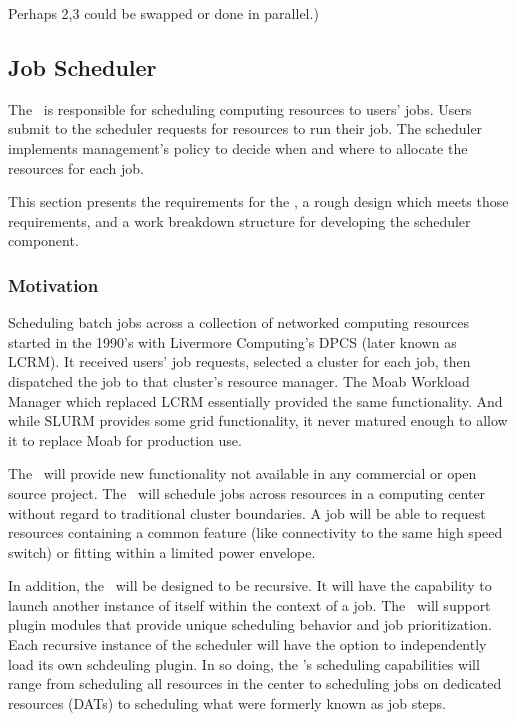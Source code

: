 Perhaps 2,3 could be swapped or done in parallel.)

\subsection{Job Scheduler}

The \ngjs\ is responsible for scheduling computing resources to users'
jobs.  Users submit to the scheduler requests for resources to run
their job.  The scheduler implements management's policy to decide
when and where to allocate the resources for each job.

This section presents the requirements for the \ngjs, a rough design
which meets those requirements, and a work breakdown structure for
developing the scheduler component.

\subsubsection{Motivation}

Scheduling batch jobs across a collection of networked computing
resources started in the 1990's with Livermore Computing's DPCS (later
known as LCRM).  It received users' job requests, selected a cluster
for each job, then dispatched the job to that cluster's resource
manager.  The Moab Workload Manager which replaced LCRM essentially
provided the same functionality.  And while SLURM provides some grid
functionality, it never matured enough to allow it to replace Moab for
production use.

The \ngjs\ will provide new functionality not available in any
commercial or open source project.  The \ngjs\ will schedule jobs
across resources in a computing center without regard to traditional
cluster boundaries.  A job will be able to request resources
containing a common feature (like connectivity to the same high speed
switch) or fitting within a limited power envelope.

In addition, the \ngjs\ will be designed to be recursive.  It will
have the capability to launch another instance of itself within the
context of a job.  The \ngjs\ will support plugin modules that provide
unique scheduling behavior and job prioritization.  Each recursive
instance of the scheduler will have the option to independently load
its own schdeuling plugin.  In so doing, the \ngjs's scheduling
capabilities will range from scheduling all resources in the center to
scheduling jobs on dedicated resources (DATs) to scheduling what were
formerly known as job steps.

